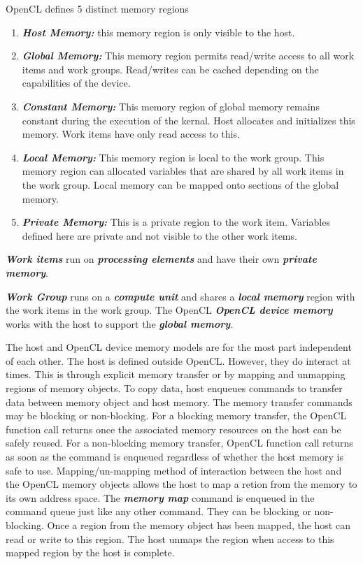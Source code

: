 OpenCL defines 5 distinct memory regions
\begin{enumerate}
	\item \textit{\textbf{Host Memory:}} this memory region is only visible to the host.
	\item \textit{\textbf{Global Memory:}} This memory region permits read/write access to all work items and work groups. Read/writes can be cached depending on the capabilities of the device.
	\item \textit{\textbf{Constant Memory:}} This memory region of global memory remains constant during the execution of the kernal. Host allocates and initializes this memory. Work items have only read access to this.
	\item \textit{\textbf{Local Memory:}} This memory region is local to the work group. This memory region can allocated variables that are shared by all work items in the work group. Local memory can be mapped onto sections of the global memory.
	\item \textit{\textbf{Private Memory:}} This is a private region to the work item. Variables defined here are private and not visible to the other work items.
\end{enumerate}

\textit{\textbf{Work items}} run on \textit{\textbf{processing elements}} and have their own \textit{\textbf{private memory}}.

\textit{\textbf{Work Group}} runs on a \textit{\textbf{compute unit}} and shares a \textit{\textbf{local memory}} region with the work items in the work group. The OpenCL \textit{\textbf{OpenCL device memory}} works with the host to support the \textit{\textbf{global memory}}.

The host and OpenCL device memory models are for the most part independent of each other. The host is defined outside OpenCL. However, they do interact at times. This is through explicit memory transfer or by mapping and unmapping regions of memory objects. To copy data, host enqueues commands to transfer data between memory object and host memory. The memory transfer commands may be blocking or non-blocking. For a blocking memory transfer, the OpenCL function call returns once the associated memory resources on the host can be safely reused. For a non-blocking memory transfer, OpenCL function call returns as soon as the command is enqueued regardless of whether the host memory is safe to use.
 Mapping/un-mapping method of interaction between the host and the OpenCL memory objects allows the host to map a retion from the memory to its own address space. The \textit{\textbf{memory map}} command is enqueued in the command queue just like any other command. They can be blocking or non-blocking. Once a region from the memory object has been mapped, the host can read or write to this region. The host unmaps the region when access to this mapped region by the host is complete.

